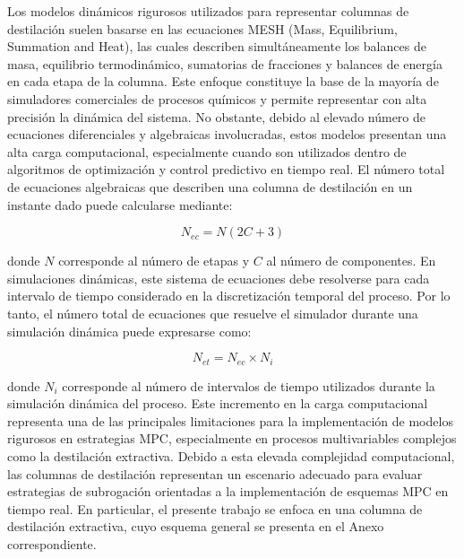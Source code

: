 \vspace{0.15cm}

Los modelos dinámicos rigurosos utilizados para representar columnas de destilación suelen basarse en las ecuaciones MESH (Mass, Equilibrium, Summation and Heat), las cuales describen simultáneamente los balances de masa, equilibrio termodinámico, sumatorias de fracciones y balances de energía en cada etapa de la columna. Este enfoque constituye la base de la mayoría de simuladores comerciales de procesos químicos y permite representar con alta precisión la dinámica del sistema. No obstante, debido al elevado número de ecuaciones diferenciales y algebraicas involucradas, estos modelos presentan una alta carga computacional, especialmente cuando son utilizados dentro de algoritmos de optimización y control predictivo en tiempo real. El número total de ecuaciones algebraicas que describen una columna de destilación en un instante dado puede calcularse mediante:

\begin{equation}
N_{ec} = N (2C + 3)
\label{eq:num_ec}
\end{equation}

donde $N$ corresponde al número de etapas y $C$ al número de componentes. En simulaciones dinámicas, este sistema de ecuaciones debe resolverse para cada intervalo de tiempo considerado en la discretización temporal del proceso. Por lo tanto, el número total de ecuaciones que resuelve el simulador durante una simulación dinámica puede expresarse como:

\begin{equation}
N_{et} = N_{ec} \times N_i
\label{eq:num_et}
\end{equation}

donde $N_i$ corresponde al número de intervalos de tiempo utilizados durante la simulación dinámica del proceso. Este incremento en la carga computacional representa una de las principales limitaciones para la implementación de modelos rigurosos en estrategias MPC, especialmente en procesos multivariables complejos como la destilación extractiva. Debido a esta elevada complejidad computacional, las columnas de destilación representan un escenario adecuado para evaluar estrategias de subrogación orientadas a la implementación de esquemas MPC en tiempo real. En particular, el presente trabajo se enfoca en una columna de destilación extractiva, cuyo esquema general se presenta en el Anexo correspondiente.

